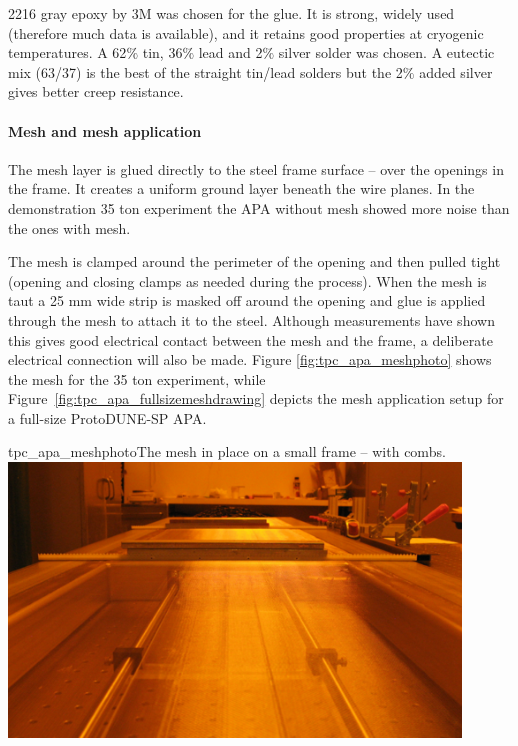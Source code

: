 2216 gray epoxy by 3M was chosen for the glue.  It is strong, widely used (therefore much data is available), and it retains good properties at cryogenic temperatures.  A 62$\%$ tin, 36$\%$ lead and 2$\%$ silver solder was chosen.  A eutectic mix (63/37) is the best of the straight tin/lead solders but the 2$\%$ added silver gives better creep resistance.


\paragraph{Mesh and mesh application}

The mesh layer is glued directly to the steel frame surface -- over the openings in the frame.  It creates a uniform ground layer beneath the wire planes.  In the demonstration 35 ton experiment the APA without mesh showed more noise than the ones with mesh.

The mesh is clamped around the perimeter of the opening and then pulled tight (opening and closing clamps as needed during the process).  When the mesh is taut a 25 mm wide strip is masked off around the opening and glue is applied through the mesh to attach it to the steel.  Although measurements have shown this gives good electrical contact between the mesh and the frame, a deliberate electrical connection will also be made.  Figure \ref{fig:tpc_apa_meshphoto} shows the mesh for the 35 ton experiment, while Figure~\ref{fig:tpc_apa_fullsizemeshdrawing} depicts the mesh application setup for a full-size ProtoDUNE-SP APA.

\begin{cdrfigure}{tpc_apa_meshphoto}{The mesh in place on a small frame -- with combs.}
\includegraphics[width=0.9\textwidth]{figures/tpc_apa_meshphoto.png} 
\end{cdrfigure}


